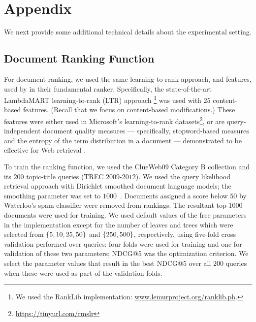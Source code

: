 \section{Appendix}
We next provide some additional technical details about the
experimental setting.
\subsection{Document Ranking Function}
\label{sec:rankFuncApp}
For document ranking, we used the same learning-to-rank approach, and features, used by \citet{Raifer+al:17a} in their fundamental ranker. Specifically,
the state-of-the-art LambdaMART learning-to-rank (LTR) approach
\cite{Wu+al:10a}\footnote{We used the RankLib implementation: \url{www.lemurproject.org/ranklib.ph}.}  was used with $25$ content-based features. (Recall that
we focus on content-based modifications.) These features were either
used in Microsoft's learning-to-rank datasets\footnote{\url{https://tinyurl.com/rmslr}}, or are query-independent document
quality measures --- specifically, stopword-based measures and the
entropy of the term distribution in a document --- demonstrated to be
effective for Web retrieval \cite{Bendersky+al:11a}.

To train the ranking function, we used the ClueWeb09 Category B collection
and its $200$ topic-title queries (TREC $2009$-$2012$). We used the query likelihood retrieval approach \cite{Song+Croft:99a} with Dirichlet
smoothed document language models; the smoothing parameter was set to
$1000$~\cite{Zhai+Lafferty:01a}. Documents assigned a score below $50$
by Waterloo's spam classifier were removed from rankings. The resultant top-$1000$ documents were used for training. We used default
values of the free parameters in the implementation except for the number of leaves and trees
which were selected from $\{5,10,25,50\}$ and $\{250,500\}$,
respectively, using five-fold cross validation performed over queries:
four folds were used for training and one for validation of these two
parameters; NDCG@5 was the optimization criterion. We select the
parameter values that result in the best NDCG@5 over all $200$ queries
when these were used as part of the validation folds.

 
